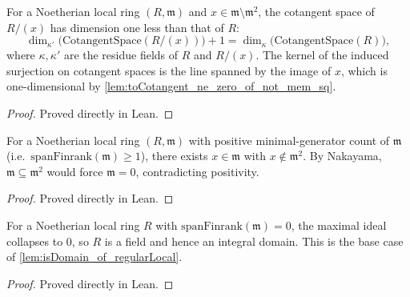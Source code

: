 \begin{lemma}
  \label{lem:finrank_cotangentSpace_quot_span_singleton_succ}
  For a Noetherian local ring \((R, \mathfrak m)\) and \(x \in \mathfrak m \setminus \mathfrak m^2\),
  the cotangent space of \(R / (x)\) has dimension one less than that of \(R\):
  \[
    \dim_{\kappa'}\!\bigl(\text{CotangentSpace}(R/(x))\bigr) + 1
      = \dim_{\kappa}\!\bigl(\text{CotangentSpace}(R)\bigr),
  \]
  where \(\kappa, \kappa'\) are the residue fields of \(R\) and \(R/(x)\). The kernel of
  the induced surjection on cotangent spaces is the line spanned by the image of \(x\),
  which is one-dimensional by \cref{lem:toCotangent_ne_zero_of_not_mem_sq}.
\end{lemma}
\begin{proof}

\leanok
  Proved directly in Lean.
\end{proof}

\begin{lemma}
  \label{lem:exists_notMemSq_of_spanFinrank_pos}
  For a Noetherian local ring \((R, \mathfrak m)\) with positive minimal-generator count
  of \(\mathfrak m\) (i.e.\ \(\text{spanFinrank}(\mathfrak m) \geq 1\)), there exists
  \(x \in \mathfrak m\) with \(x \notin \mathfrak m^2\). By Nakayama, \(\mathfrak m \subseteq \mathfrak m^2\)
  would force \(\mathfrak m = 0\), contradicting positivity.
\end{lemma}
\begin{proof}

\leanok
  Proved directly in Lean.
\end{proof}

\begin{lemma}
  \label{lem:isDomain_of_isLocalRing_of_spanFinrank_maximalIdeal_eq_zero}
  For a Noetherian local ring \(R\) with \(\text{spanFinrank}(\mathfrak m) = 0\), the maximal
  ideal collapses to \(0\), so \(R\) is a field and hence an integral domain. This is the
  base case of \cref{lem:isDomain_of_regularLocal}.
\end{lemma}
\begin{proof}

\leanok
  Proved directly in Lean.
\end{proof}

